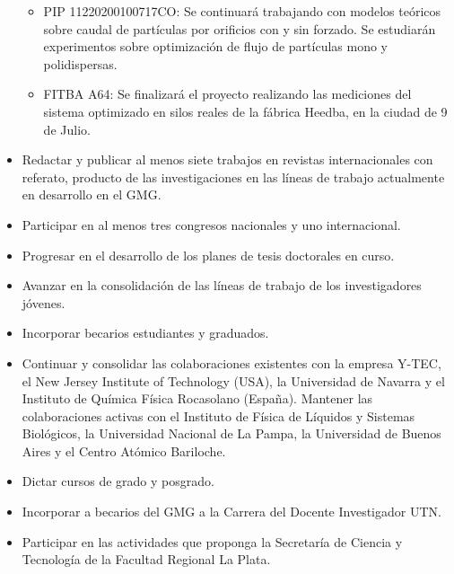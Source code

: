 \documentclass[a4paper,11pt,twoside,final,titlepage,onecolumn,openright]{report}
\begin{document}
\begin{itemize}
\begin{itemize}
\item PIP 11220200100717CO: Se continuará trabajando con modelos teóricos sobre caudal de partículas por orificios con y sin forzado. Se estudiarán experimentos sobre optimización de flujo de partículas mono y polidispersas. 
\item FITBA A64: Se finalizará el proyecto realizando las mediciones del sistema optimizado en silos reales de la fábrica Heedba, en la ciudad de 9 de Julio.
\end{itemize}
\item  Redactar y publicar al menos siete trabajos en revistas internacionales con referato, producto de las investigaciones en las líneas de trabajo actualmente en desarrollo en el GMG.
\item  Participar en al menos tres congresos nacionales y uno internacional. 
\item  Progresar en el desarrollo de los planes de tesis doctorales en curso.
\item  Avanzar en la consolidación de las líneas de trabajo de los investigadores jóvenes. 
\item  Incorporar becarios estudiantes y graduados. 
\item  Continuar y consolidar las colaboraciones existentes con la empresa Y-TEC, el New Jersey Institute of Technology (USA), la Universidad de Navarra y el Instituto de Química Física Rocasolano (España). Mantener las colaboraciones activas con el Instituto de Física de Líquidos y Sistemas Biológicos, la Universidad Nacional de La Pampa, la Universidad de Buenos Aires y el Centro Atómico Bariloche.
\item  Dictar cursos de grado y posgrado.
\item  Incorporar a becarios del GMG a la Carrera del Docente Investigador UTN.
\item  Participar en las actividades que proponga la Secretaría de Ciencia y Tecnología de la Facultad Regional La Plata.
\end{itemize}
\end{document}
